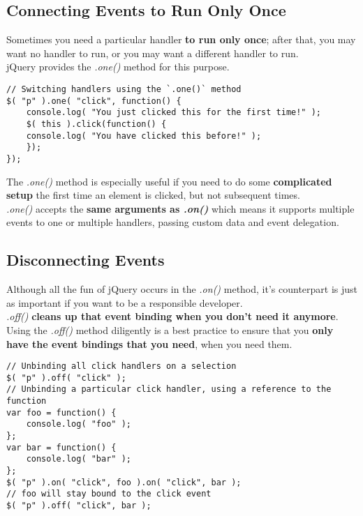 \documentclass[10pt,letterpaper]{report}
\begin{document}
\subsection{Connecting Events to Run Only Once}
Sometimes you need a particular handler \textbf{to run only once}; after that, you may want no handler to run, or you may want a different handler to run.\\ jQuery provides the \textit{.one()} method for this purpose.
\begin{lstlisting}
// Switching handlers using the `.one()` method
$( "p" ).one( "click", function() {
	console.log( "You just clicked this for the first time!" );
	$( this ).click(function() {
	console.log( "You have clicked this before!" );
	});
});
\end{lstlisting}
The \textit{.one()} method is especially useful if you need to do some \textbf{complicated setup} the first time an element is clicked, but not subsequent times.\\ \textit{.one()} accepts the \textbf{same arguments as \textit{.on()}} which means it supports multiple events to one or multiple handlers, passing custom data and event delegation.
\subsection{Disconnecting Events}
Although all the fun of jQuery occurs in the \textit{.on()} method, it's counterpart is just as important if you want to be a responsible developer.\\ \textit{.off()} \textbf{cleans up that event binding when you don't need it anymore}.\\ Using the \textit{.off()} method diligently is a best practice to ensure that you \textbf{only have the event bindings that you need}, when you need them.
\begin{lstlisting}
// Unbinding all click handlers on a selection
$( "p" ).off( "click" );
// Unbinding a particular click handler, using a reference to the function
var foo = function() {
	console.log( "foo" );
};
var bar = function() {
	console.log( "bar" );
};
$( "p" ).on( "click", foo ).on( "click", bar );
// foo will stay bound to the click event
$( "p" ).off( "click", bar );
\end{lstlisting}
\end{document}

